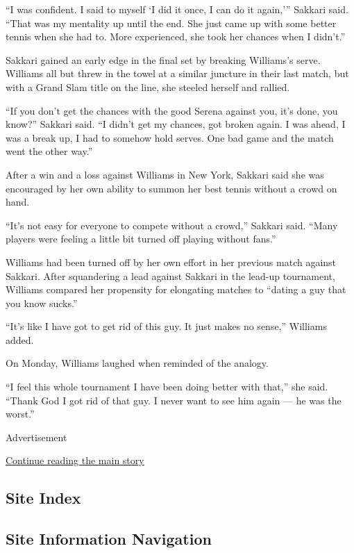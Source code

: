 ``I was confident. I said to myself `I did it once, I can do it
again,''' Sakkari said. ``That was my mentality up until the end. She
just came up with some better tennis when she had to. More experienced,
she took her chances when I didn't.''

Sakkari gained an early edge in the final set by breaking Williams's
serve. Williams all but threw in the towel at a similar juncture in
their last match, but with a Grand Slam title on the line, she steeled
herself and rallied.

``If you don't get the chances with the good Serena against you, it's
done, you know?'' Sakkari said. ``I didn't get my chances, got broken
again. I was ahead, I was a break up, I had to somehow hold serves. One
bad game and the match went the other way.''

After a win and a loss against Williams in New York, Sakkari said she
was encouraged by her own ability to summon her best tennis without a
crowd on hand.

``It's not easy for everyone to compete without a crowd,'' Sakkari said.
``Many players were feeling a little bit turned off playing without
fans.''

Williams had been turned off by her own effort in her previous match
against Sakkari. After squandering a lead against Sakkari in the lead-up
tournament, Williams compared her propensity for elongating matches to
``dating a guy that you know sucks.''

``It's like I have got to get rid of this guy. It just makes no sense,''
Williams added.

On Monday, Williams laughed when reminded of the analogy.

``I feel this whole tournament I have been doing better with that,'' she
said. ``Thank God I got rid of that guy. I never want to see him again
--- he was the worst.''

Advertisement

\protect\hyperlink{after-bottom}{Continue reading the main story}

\hypertarget{site-index}{%
\subsection{Site Index}\label{site-index}}

\hypertarget{site-information-navigation}{%
\subsection{Site Information
Navigation}\label{site-information-navigation}}


